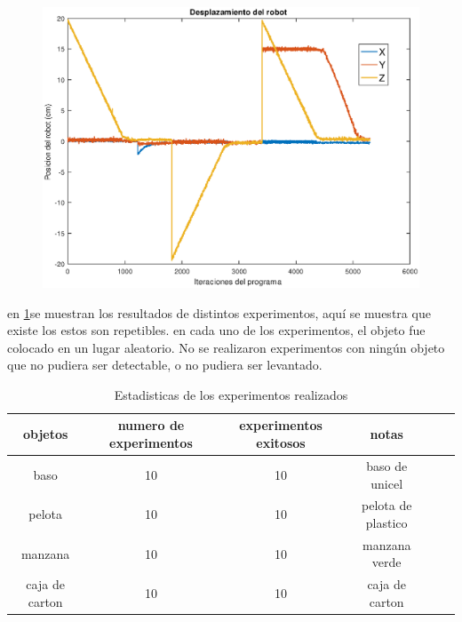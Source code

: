 \begin{figure}
	\centering
	\includegraphics[width=1\linewidth]{visio/graficasderesultados/posicion1}
	\caption{}
	\label{fig:posicion1}
\end{figure}




en \cref{tab:result1}se muestran los resultados de distintos experimentos, aquí se muestra que existe los estos son repetibles.
en cada uno de los experimentos, el objeto fue colocado en un lugar aleatorio.
No se realizaron experimentos con ningún objeto que no pudiera ser detectable, o no pudiera ser levantado.
\\



\begin{table}[h]
	\caption{Estadisticas de los experimentos realizados} \label{tab:result1} 
	\centering
	\footnotesize 
\begin{tabular}{|c||c|c|c|c|c|}
\hline
objetos	 & numero de experimentos & experimentos exitosos  & notas\\
\hline  
\hline  
baso & 10  & 10 &  baso de unicel   \\
pelota & 10 &  10 &  pelota de plastico  \\
manzana & 10 &  10 & manzana verde \\ 
caja de carton & 10 &  10 & caja de carton  \\
\hline 
\end{tabular} 
	\bigskip
\\
\end{table}

